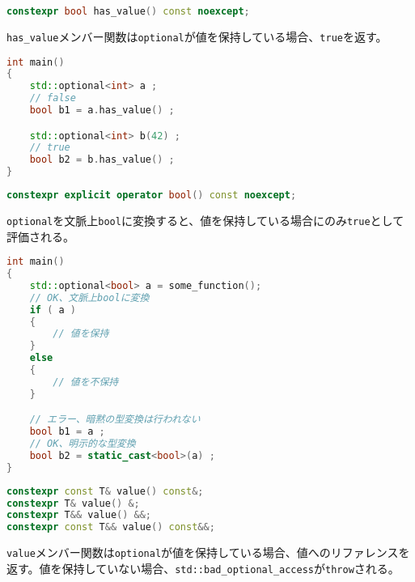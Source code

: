 \bgroup
\begin{lstlisting}[language=C++]
constexpr bool has_value() const noexcept;
\end{lstlisting}
\egroup

\lstinline!has_value!メンバー関数は\lstinline!optional!が値を保持している場合、\lstinline!true!を返す。

\begin{lstlisting}[language=C++]
int main()
{
    std::optional<int> a ;
    // false
    bool b1 = a.has_value() ;

    std::optional<int> b(42) ;
    // true
    bool b2 = b.has_value() ;
}
\end{lstlisting}

%

\bgroup
\begin{lstlisting}[language=C++]
constexpr explicit operator bool() const noexcept;
\end{lstlisting}
\egroup

\lstinline!optional!を文脈上\lstinline!bool!に変換すると、値を保持している場合にのみ\lstinline!true!として評価される。

\begin{lstlisting}[language=C++]
int main()
{
    std::optional<bool> a = some_function();
    // OK、文脈上boolに変換
    if ( a )
    {
        // 値を保持
    }
    else
    {
        // 値を不保持
    }

    // エラー、暗黙の型変換は行われない
    bool b1 = a ;
    // OK、明示的な型変換
    bool b2 = static_cast<bool>(a) ;
}
\end{lstlisting}

%

\bgroup
\begin{lstlisting}[language=C++]
constexpr const T& value() const&;
constexpr T& value() &;
constexpr T&& value() &&;
constexpr const T&& value() const&&;
\end{lstlisting}
\egroup

\lstinline!value!メンバー関数は\lstinline!optional!が値を保持している場合、値へのリファレンスを返す。値を保持していない場合、\lstinline!std::bad_optional_access!が\lstinline!throw!される。

